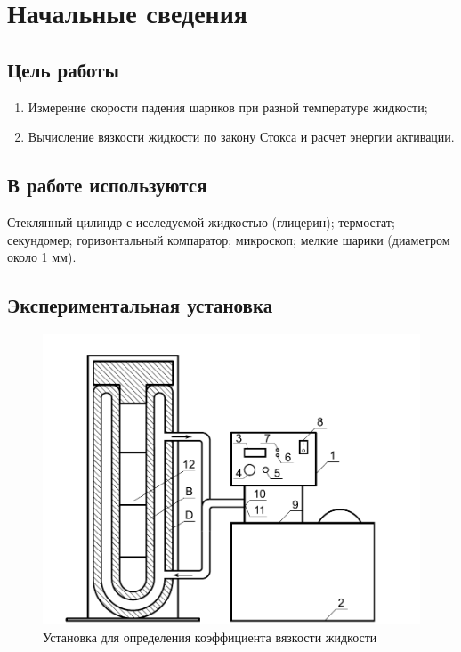 \documentclass{letnab}
\begin{document}
	\large

\section{Начальные сведения}
\subsection*{Цель работы}
\begin{enumerate}
	\item Измерение скорости падения шариков при разной температуре жидкости; 
	\item Вычисление вязкости жидкости по закону Стокса и расчет энергии активации.
\end{enumerate}

\subsection*{В работе используются}
Стеклянный цилиндр с исследуемой жидкостью (глицерин); термостат; секундомер; горизонтальный компаратор; микроскоп; мелкие шарики (диаметром около 1 мм).

\subsection*{Экспериментальная установка}
\begin{figure}[H]
	\includegraphics[width = 150 mm]{the_station.png}
	\caption{Установка для определения коэффициента вязкости жидкости}
\end{figure}
\end{document}
